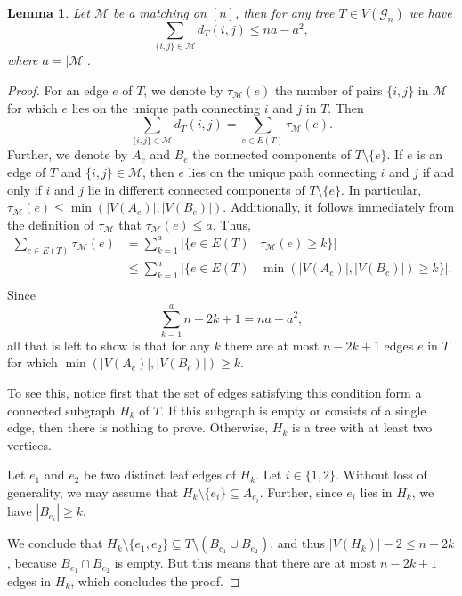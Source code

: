 \documentclass[reqno,dvipsnames]{amsart}
\theoremstyle{plain}
\newtheorem{lemma}[theorem]{Lemma}
\numberwithin{equation}{section}
\theoremstyle{definition}
\begin{document}
\begin{lemma}\label{lem:bestmatching}
	Let $\mathcal{M}$ be a matching on $[n]$, then for any tree $T\in V(\mathcal{G}_n)$ we have
	\[
	\sum_{\{i,j\}\in \mathcal{M}} d_T(i,j) \leq na-a^2, 
	\]
	where $a = |\mathcal{M}|$.
\end{lemma}

\begin{proof}
	For an edge $e$ of $T$, we denote by $\tau_\mathcal{M}(e)$ the number of pairs $\{i,j\}$ in $\mathcal{M}$ for which $e$ lies on the unique path connecting $i$ and $j$ in $T$. Then
	\[
	\sum_{\{i,j\}\in \mathcal{M}} d_T(i,j) = \sum_{e\in E(T)}\tau_\mathcal{M}(e).
	\] 
	Further, we denote by $A_e$ and $B_e$ the connected components of $T\setminus \{e\}$. If $e$ is an edge of $T$ and $\{i,j\}\in \mathcal{M}$, then $e$ lies on the unique path connecting $i$ and $j$ if and only if $i$ and $j$ lie in different connected components of $T\setminus \{e\}$. In particular, $\tau_\mathcal{M}(e) \leq \min(|V(A_e)|,|V(B_e)|)$. Additionally, it follows immediately from the definition of $\tau_\mathcal{M}$ that $\tau_\mathcal{M}(e)\leq a$. Thus,
	\[
	\begin{split}
	\sum_{e\in E(T)}\tau_\mathcal{M}(e) &= \sum_{k = 1}^{a} |\{e\in E(T)\mid \tau_\mathcal{M}(e)\geq k\}|\\
	&\leq \sum_{k = 1}^{a}|\{e\in E(T)\mid \min(|V(A_e)|,|V(B_e)|)\geq k\}|.\\
	\end{split}
	\]
	Since 
	\[
	\sum_{k = 1}^{a} n-2k +1 = na-a^2,
	\]
	all that is left to show is that for any $k$ there are at most $n-2k + 1$ edges $e$ in $T$ for which $\min(|V(A_e)|,|V(B_e)|)\geq k$. 

	To see this, notice first that the set of edges satisfying this condition form a connected subgraph $H_k$ of $T$. If this subgraph is empty or consists of a single edge, then there is nothing to prove. Otherwise, $H_k$ is a tree with at least two vertices.

	Let $e_1$ and $e_2$ be two distinct leaf edges of $H_k$. Let $i\in \{1,2\}$. Without loss of generality, we may assume that $H_k \setminus \{e_i\}\subseteq A_{e_i}$. Further, since $e_i$ lies in $H_k$, we have $|B_{e_i}|\geq k$.

	We conclude that $H_k\setminus \{e_1,e_2\} \subseteq T\setminus (B_{e_1}\cup B_{e_2})$, and thus $|V(H_k)|-2 \leq n-2k $, because $B_{e_1}\cap B_{e_2}$ is empty. But this means that there are at most $n-2k + 1$ edges in $H_k$, which concludes the proof.
\end{proof}
\end{document}

